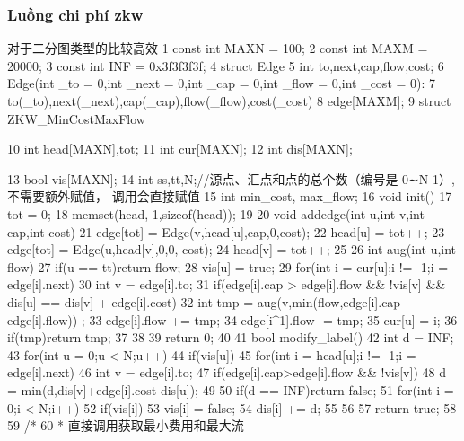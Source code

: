 \documentclass[11pt]{article}
\begin{document}
\subsubsection{Luồng chi phí zkw}

\begin{Code}
     对于二分图类型的比较高效
1    const int MAXN = 100;
2    const int MAXM = 20000;
3    const int INF = 0x3f3f3f3f;
4    struct Edge{
5        int to,next,cap,flow,cost;
6        Edge(int _to = 0,int _next = 0,int _cap = 0,int _flow = 0,int
            _cost = 0):
 7           to(_to),next(_next),cap(_cap),flow(_flow),cost(_cost){}
 8   }edge[MAXM];
 9   struct ZKW_MinCostMaxFlow{
10       int head[MAXN],tot;
11       int cur[MAXN];
12       int dis[MAXN];


13       bool vis[MAXN];
14       int ss,tt,N;//源点、汇点和点的总个数（编号是 0∼N-1）, 不需要额外赋值，
            调用会直接赋值
15       int min_cost, max_flow;
16       void init(){
17           tot = 0;
18           memset(head,-1,sizeof(head));
19       }
20       void addedge(int u,int v,int cap,int cost){
21           edge[tot] = Edge(v,head[u],cap,0,cost);
22           head[u] = tot++;
23           edge[tot] = Edge(u,head[v],0,0,-cost);
24           head[v] = tot++;
25       }
26       int aug(int u,int flow){
27           if(u == tt)return flow;
28           vis[u] = true;
29           for(int i = cur[u];i != -1;i = edge[i].next){
30               int v = edge[i].to;
31               if(edge[i].cap > edge[i].flow && !vis[v] && dis[u] ==
                    dis[v] + edge[i].cost){
32                    int tmp = aug(v,min(flow,edge[i].cap-edge[i].flow))
                         ;
33                    edge[i].flow += tmp;
34                    edge[i^1].flow -= tmp;
35                    cur[u] = i;
36                    if(tmp)return tmp;
37               }
38           }
39           return 0;
40       }
41       bool modify_label(){
42           int d = INF;
43           for(int u = 0;u < N;u++)
44               if(vis[u])
45                    for(int i = head[u];i != -1;i = edge[i].next){
46                         int v = edge[i].to;
47                         if(edge[i].cap>edge[i].flow && !vis[v])
48                             d = min(d,dis[v]+edge[i].cost-dis[u]);
49                    }
50           if(d == INF)return false;
51           for(int i = 0;i < N;i++)
52               if(vis[i]){
53                    vis[i] = false;
54                    dis[i] += d;
55
56                  }
57              return true;
58       }
59       /*
60         * 直接调用获取最小费用和最大流


}
\end{Code}
\end{document}
